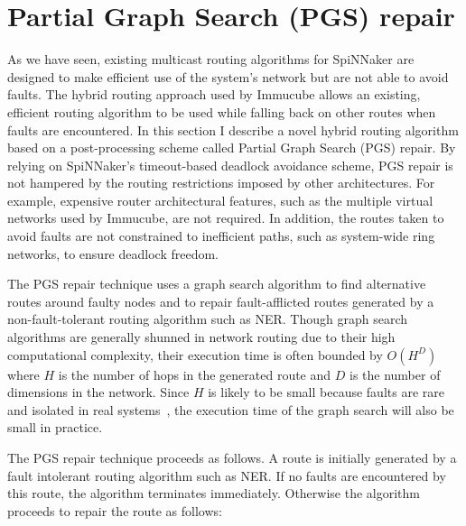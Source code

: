 	\section{Partial Graph Search (PGS) repair}
		
		As we have seen, existing multicast routing algorithms for SpiNNaker are
		designed to make efficient use of the system's network but are not able to
		avoid faults. The hybrid routing approach used by Immucube allows an
		existing, efficient routing algorithm to be used while falling back on
		other routes when faults are encountered.  In this section I describe a
		novel hybrid routing algorithm based on a post-processing scheme called
		Partial Graph Search (PGS) repair. By relying on SpiNNaker's timeout-based
		deadlock avoidance scheme, PGS repair is not hampered by the routing
		restrictions imposed by other architectures. For example, expensive router
		architectural features, such as the multiple virtual networks used by
		Immucube, are not required. In addition, the routes taken to avoid faults
		are not constrained to inefficient paths, such as system-wide ring
		networks, to ensure deadlock freedom.
		
		The PGS repair technique uses a graph search algorithm to find alternative
		routes around faulty nodes and to repair fault-afflicted routes generated
		by a non-fault-tolerant routing algorithm such as NER. Though graph search
		algorithms are generally shunned in network routing due to their high
		computational complexity, their execution time is often bounded by $O(H^D)$
		where $H$ is the number of hops in the generated route and $D$ is the
		number of dimensions in the network.  Since $H$ is likely to be small
		because faults are rare and isolated in real
		systems~\cite{gara05,alverson12}, the execution time of the graph search
		will also be small in practice.
		
		The PGS repair technique proceeds as follows. A route is initially
		generated by a fault intolerant routing algorithm such as NER. If no faults
		are encountered by this route, the algorithm terminates immediately.
		Otherwise the algorithm proceeds to repair the route as follows:
		

